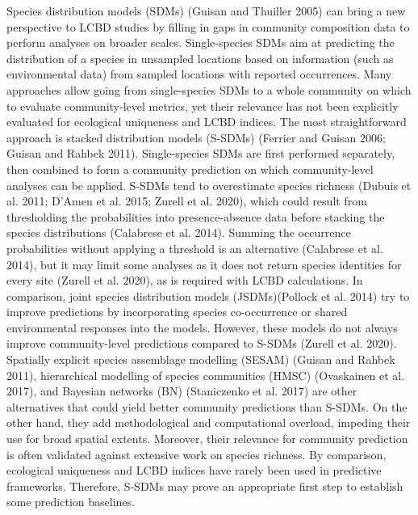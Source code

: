 \documentclass[10pt,oneside]{article}
\begin{document}
Species distribution models (SDMs) (Guisan and Thuiller 2005) can bring
a new perspective to LCBD studies by filling in gaps in community
composition data to perform analyses on broader scales. Single-species
SDMs aim at predicting the distribution of a species in unsampled
locations based on information (such as environmental data) from sampled
locations with reported occurrences. Many approaches allow going from
single-species SDMs to a whole community on which to evaluate
community-level metrics, yet their relevance has not been explicitly
evaluated for ecological uniqueness and LCBD indices. The most
straightforward approach is stacked distribution models (S-SDMs)
(Ferrier and Guisan 2006; Guisan and Rahbek 2011). Single-species SDMs
are first performed separately, then combined to form a community
prediction on which community-level analyses can be applied. S-SDMs tend
to overestimate species richness (Dubuis et al. 2011; D'Amen et al.
2015; Zurell et al. 2020), which could result from thresholding the
probabilities into presence-absence data before stacking the species
distributions (Calabrese et al. 2014). Summing the occurrence
probabilities without applying a threshold is an alternative (Calabrese
et al. 2014), but it may limit some analyses as it does not return
species identities for every site (Zurell et al. 2020), as is required
with LCBD calculations. In comparison, joint species distribution models
(JSDMs)(Pollock et al. 2014) try to improve predictions by incorporating
species co-occurrence or shared environmental responses into the models.
However, these models do not always improve community-level predictions
compared to S-SDMs (Zurell et al. 2020). Spatially explicit species
assemblage modelling (SESAM) (Guisan and Rahbek 2011), hierarchical
modelling of species communities (HMSC) (Ovaskainen et al. 2017), and
Bayesian networks (BN) (Staniczenko et al. 2017) are other alternatives
that could yield better community predictions than S-SDMs. On the other
hand, they add methodological and computational overload, impeding their
use for broad spatial extents. Moreover, their relevance for community
prediction is often validated against extensive work on species
richness. By comparison, ecological uniqueness and LCBD indices have
rarely been used in predictive frameworks. Therefore, S-SDMs may prove
an appropriate first step to establish some prediction baselines.
\end{document}
